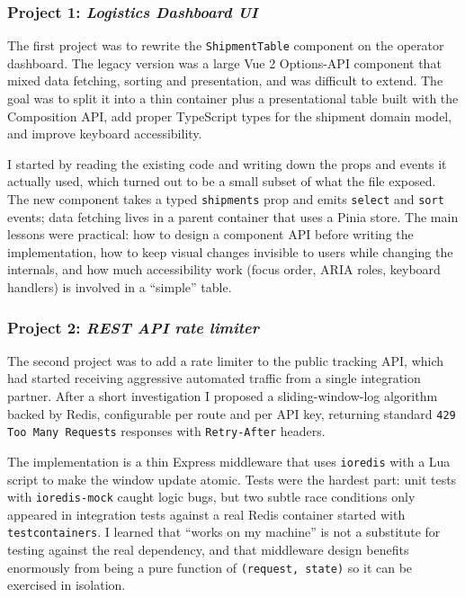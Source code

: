 \documentclass[11pt,a4paper]{article}
\begin{document}
\subsubsection{Project 1: \textit{Logistics Dashboard UI}}
The first project was to rewrite the \texttt{ShipmentTable} component on the operator dashboard. The legacy version was a large Vue 2 Options-API component that mixed data fetching, sorting and presentation, and was difficult to extend. The goal was to split it into a thin container plus a presentational table built with the Composition API, add proper TypeScript types for the shipment domain model, and improve keyboard accessibility.

I started by reading the existing code and writing down the props and events it actually used, which turned out to be a small subset of what the file exposed. The new component takes a typed \texttt{shipments} prop and emits \texttt{select} and \texttt{sort} events; data fetching lives in a parent container that uses a Pinia store. The main lessons were practical: how to design a component API before writing the implementation, how to keep visual changes invisible to users while changing the internals, and how much accessibility work (focus order, ARIA roles, keyboard handlers) is involved in a ``simple'' table.

\subsubsection{Project 2: \textit{REST API rate limiter}}
The second project was to add a rate limiter to the public tracking API, which had started receiving aggressive automated traffic from a single integration partner. After a short investigation I proposed a sliding-window-log algorithm backed by Redis, configurable per route and per API key, returning standard \texttt{429 Too Many Requests} responses with \texttt{Retry-After} headers.

The implementation is a thin Express middleware that uses \texttt{ioredis} with a Lua script to make the window update atomic. Tests were the hardest part: unit tests with \texttt{ioredis-mock} caught logic bugs, but two subtle race conditions only appeared in integration tests against a real Redis container started with \texttt{testcontainers}. I learned that ``works on my machine'' is not a substitute for testing against the real dependency, and that middleware design benefits enormously from being a pure function of \texttt{(request, state)} so it can be exercised in isolation.
\end{document}
